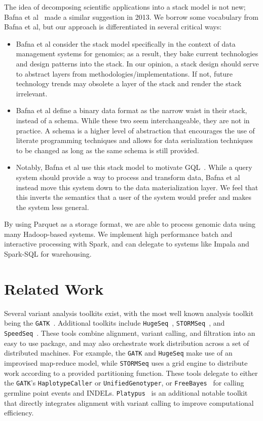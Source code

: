 \documentclass[masters]{ucbthesis}
\begin{document}
The idea of decomposing scientific applications into a stack model is not new; Bafna et al~\cite{bafna13}
made a similar suggestion in 2013. We borrow some vocabulary from Bafna et al, but our approach is
differentiated in several critical ways:

\begin{itemize}
\item Bafna et al consider the stack model specifically in the context of data management systems for
genomics; as a result, they bake current technologies and design patterns into the stack. In our opinion,
a stack design should serve to abstract layers from methodologies/implementations. If not, future
technology trends may obsolete a layer of the stack and render the stack irrelevant.
\item Bafna et al define a binary data format as the narrow waist in their stack, instead of a schema.
While these two seem interchangeable, they are not in practice. A schema is a higher level of abstraction
that encourages the use of literate programming techniques and allows for data serialization techniques
to be changed as long as the same schema is still provided.
\item Notably, Bafna et al use this stack model to motivate GQL~\cite{kozanitis14}. While a query system
should provide a way to process and transform data, Bafna et al instead move this system down to the
data materialization layer. We feel that this inverts the semantics that a user of the system would prefer
and makes the system less general.
\end{itemize}

By using Parquet as a storage format, we are able to process genomic data using many Hadoop-based
systems. We implement high performance batch and interactive processing with Spark, and can delegate
to systems like Impala and Spark-SQL for warehousing.

\section{Related Work}
\label{sec:related-work}

Several variant analysis toolkits exist, with the most well known analysis toolkit being the
\texttt{GATK}~\cite{depristo11}. Additional toolkits include \texttt{HugeSeq}~\cite{lam12},
\texttt{STORMSeq}~\cite{karczewski14}, and \texttt{SpeedSeq}~\cite{chiang14}. These tools combine
alignment, variant calling, and filtration into an easy to use package, and may also orchestrate
work distribution across a set of distributed machines. For example, the \texttt{GATK} and
\texttt{HugeSeq} make use of an improvised map-reduce model, while \texttt{STORMSeq} uses a grid
engine to distribute work according to a provided partitioning function. These tools delegate to either
the \texttt{GATK}'s \texttt{HaplotypeCaller} or \texttt{UnifiedGenotyper}, or
\texttt{FreeBayes}~\cite{garrison12} for calling germline point events and INDELs.
\texttt{Platypus}~\cite{rimmer14} is an additional notable toolkit that directly integrates alignment with
variant calling to improve computational efficiency.
\end{document}
